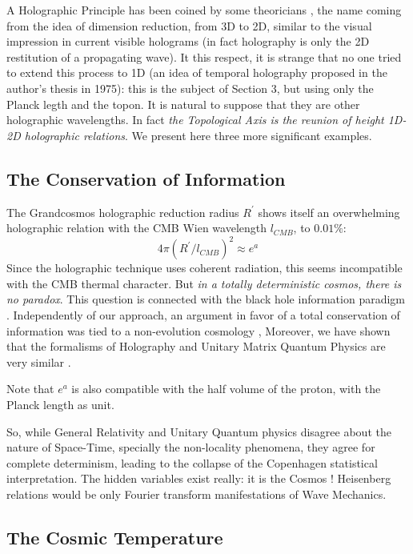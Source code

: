 \documentclass[twoside,draft]{article}
\begin{document}
\begin{sloppypar}
A Holographic Principle has been coined by some theoricians \cite{Bousso}, the name coming from the idea of dimension reduction, from 3D to 2D, similar to the visual impression in current visible holograms (in fact holography is only the 2D restitution of a propagating wave). It this respect, it is strange that no one tried to extend this process to 1D (an idea of temporal holography proposed in the author's thesis in 1975): this is the subject of Section 3, but using only the Planck legth and the topon. It is natural to suppose that they are other holographic wavelengths. In fact \textit{the Topological Axis is the reunion of height 1D-2D holographic relations}. We present here three more significant examples. 

\subsection{The Conservation of Information}

The Grandcosmos holographic reduction radius $R^{\prime}$ shows itself an overwhelming holographic
relation with the CMB Wien wavelength $l_{CMB}$, to $0.01\%$:
\begin{equation}
4\pi(R^{\prime}/l_{CMB})^{2} \approx e^{a}
\end{equation}
Since the holographic technique uses coherent radiation, this seems incompatible with the CMB
thermal character. But \textit{in a totally deterministic cosmos, there is no paradox}. This question is
connected with the black hole information paradigm \cite{Preskill}. Independently of our approach, an
argument in favor of a total conservation of information was tied to a non-evolution cosmology
\cite{Nikolic}, Moreover, we have shown that the formalisms of Holography and Unitary Matrix Quantum
Physics are very similar \cite{Sanchez1}. 

Note that $e^{a}$ is also compatible with the half volume of the proton, with
the Planck length as unit.

So, while General Relativity and Unitary Quantum physics disagree about the nature of Space-Time, specially the non-locality phenomena, they agree for complete determinism, leading to the collapse of the
Copenhagen statistical interpretation. The hidden variables exist really: it is the Cosmos ! Heisenberg
relations would be only Fourier transform manifestations of Wave Mechanics.
\subsection{The Cosmic Temperature}


\end{sloppypar}
\end{document}
